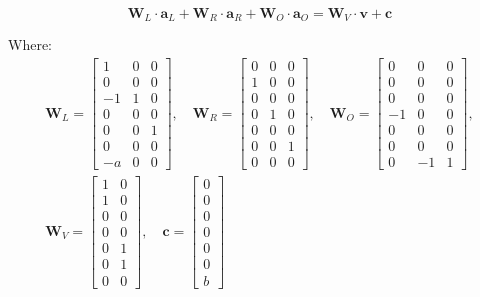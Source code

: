 \documentclass[../../book.tex]{subfiles}
\begin{document}
\begin{example}
    \begin{equation*}
    \mathbf{W}_L \cdot \mathbf{a}_L + \mathbf{W}_R \cdot \mathbf{a}_R + \mathbf{W}_O \cdot \mathbf{a}_O = \mathbf{W}_V \cdot \mathbf{v} + \mathbf{c}
    \end{equation*}
    
    Where:
    \begin{align*}
    \mathbf{W}_L = \begin{bmatrix}
        1 & 0 & 0 \\
        0 & 0 & 0 \\
        -1 & 1 & 0 \\
        0 & 0 & 0 \\
        0 & 0 & 1 \\
        0 & 0 & 0 \\
        -a & 0 & 0
    \end{bmatrix},\quad
    \mathbf{W}_R = \begin{bmatrix}
        0 & 0 & 0 \\
        1 & 0 & 0 \\
        0 & 0 & 0 \\
        0 & 1 & 0 \\
        0 & 0 & 0 \\
        0 & 0 & 1 \\
        0 & 0 & 0
    \end{bmatrix},\quad
    \mathbf{W}_O = \begin{bmatrix}
        0 & 0 & 0 \\
        0 & 0 & 0 \\
        0 & 0 & 0 \\
        -1 & 0 & 0 \\
        0 & 0 & 0 \\
        0 & 0 & 0 \\
        0 & -1 & 1
    \end{bmatrix},\\
    \mathbf{W}_V = \begin{bmatrix}
        1 & 0 \\
        1 & 0 \\
        0 & 0 \\
        0 & 0 \\
        0 & 1 \\
        0 & 1 \\
        0 & 0
    \end{bmatrix},\quad
    \mathbf{c} = \begin{bmatrix}
        0 \\ 0 \\ 0 \\ 0 \\ 0 \\ 0 \\ b
    \end{bmatrix}
\end{align*}
    




\end{example}
\end{document}
